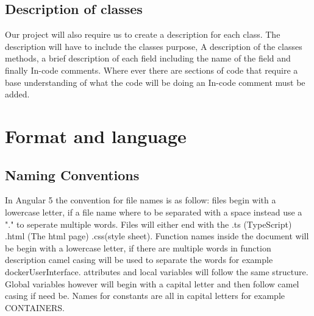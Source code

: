 \documentclass[a4paper]{article}
\begin{document}
\subsection{Description of classes}
Our project will also require us to create a description for each class. The description will have to include the classes purpose, A description of the classes methods, a brief description of each field including the name of the field and finally In-code comments. Where ever there are sections of code that require a base understanding of what the code will be doing an In-code comment must be added.

\section{Format and language}
\subsection{Naming Conventions}
In Angular 5 the convention for file names is as follow:
files begin with a lowercase letter, if a file name where to be separated with a space instead use a "." to seperate multiple words. Files will either end with the .ts (TypeScript) .html (The html page) .css(style sheet). Function names inside the document will be begin with a lowercase letter, if there are multiple words in function description camel casing will be used to separate the words for example dockerUserInterface. attributes and local variables will follow the same structure. Global variables however will begin with a capital letter and then follow camel casing if need be. Names for constants are all in capital letters for example CONTAINERS.
\end{document}
